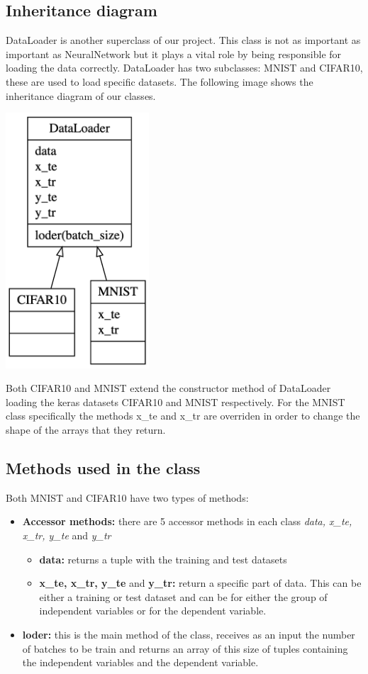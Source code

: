 \documentclass[11pt]{article}
\begin{document}
\subsection{Inheritance diagram}
DataLoader is another superclass of our project. This class is not as important as important as NeuralNetwork but it plays a vital role by being responsible for loading the data correctly. DataLoader has two subclasses: MNIST and CIFAR10, these are used to load specific datasets. The following image shows the inheritance diagram of our classes.
\begin{center}
\includegraphics[width=0.4\textwidth]{dataloader.png}
\end{center}
Both CIFAR10 and MNIST extend the constructor method of DataLoader loading the keras datasets CIFAR10 and MNIST respectively. For the MNIST class specifically the methods x\_te and x\_tr are overriden in order to change the shape of the arrays that they return.

\subsection{Methods used in the class}
Both MNIST and CIFAR10 have two types of methods:
\begin{itemize}
\item \textbf{Accessor methods:}  there are 5 accessor methods in each class \emph{data, x\_te, x\_tr, y\_te} and \emph{y\_tr}
	\begin{itemize}
	\item \textbf{data:} returns a tuple with the training and test datasets
	\item \textbf{x\_te, x\_tr, y\_te} and \textbf{y\_tr:} return a specific part of data. This can be either a training or test dataset and can be for either the group of independent variables or for the dependent variable.
	\end{itemize}
\item \textbf{loder:} this is the main method of the class, receives as an input the number of batches to be train and returns an array of this size of tuples containing the independent variables and the dependent variable.
\end{itemize}
\end{document}
